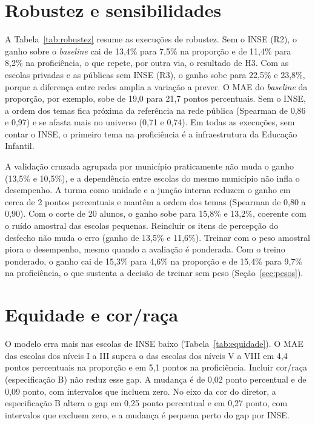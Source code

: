 \section{Robustez e sensibilidades}
\label{sec:res-robustez}

A Tabela~\ref{tab:robustez} resume as execuções de robustez. Sem o INSE
(R2), o ganho sobre o \textit{baseline} cai de 13,4\% para 7,5\% na
proporção e de 11,4\% para 8,2\% na proficiência, o que repete, por outra
via, o resultado de H3. Com as escolas privadas e as públicas sem INSE
(R3), o ganho sobe para 22,5\% e 23,8\%, porque a diferença entre redes
amplia a variação a prever. O MAE do \textit{baseline} da proporção, por
exemplo, sobe de 19,0 para 21,7 pontos percentuais. Sem o INSE, a ordem dos
temas fica próxima da referência na rede pública (Spearman de 0,86 e 0,97)
e se afasta mais no universo (0,71 e 0,74). Em todas as execuções, sem
contar o INSE, o primeiro tema na proficiência é a infraestrutura da
Educação Infantil.



A validação cruzada agrupada por município praticamente não muda o ganho
(13,5\% e 10,5\%), e a dependência entre escolas do mesmo município não
infla o desempenho. A turma como unidade e a junção interna reduzem o
ganho em cerca de 2 pontos percentuais e mantêm a ordem dos temas
(Spearman de 0,80 a 0,90). Com o corte de 20 alunos, o ganho sobe para
15,8\% e 13,2\%, coerente com o ruído amostral das escolas pequenas.
Reincluir os itens de percepção do desfecho não muda o erro (ganho de
13,5\% e 11,6\%). Treinar com o peso amostral piora o desempenho, mesmo
quando a avaliação é ponderada. Com o treino ponderado, o ganho cai de
15,3\% para 4,6\% na proporção e de 15,4\% para 9,7\% na proficiência, o que
sustenta a decisão de treinar sem peso (Seção~\ref{sec:pesos}).

\section{Equidade e cor/raça}
\label{sec:res-equidade}

O modelo erra mais nas escolas de INSE baixo (Tabela~\ref{tab:equidade}).
O MAE das escolas dos níveis I a III supera o das escolas dos níveis V a
VIII em 4,4 pontos percentuais na proporção e em 5,1 pontos na
proficiência. Incluir cor/raça (especificação B) não reduz esse gap. A
mudança é de 0,02 ponto percentual e de 0,09 ponto, com intervalos que
incluem zero. No eixo da cor do diretor, a especificação B altera o gap em
0,25 ponto percentual e em 0,27 ponto, com intervalos que excluem zero, e
a mudança é pequena perto do gap por INSE.


